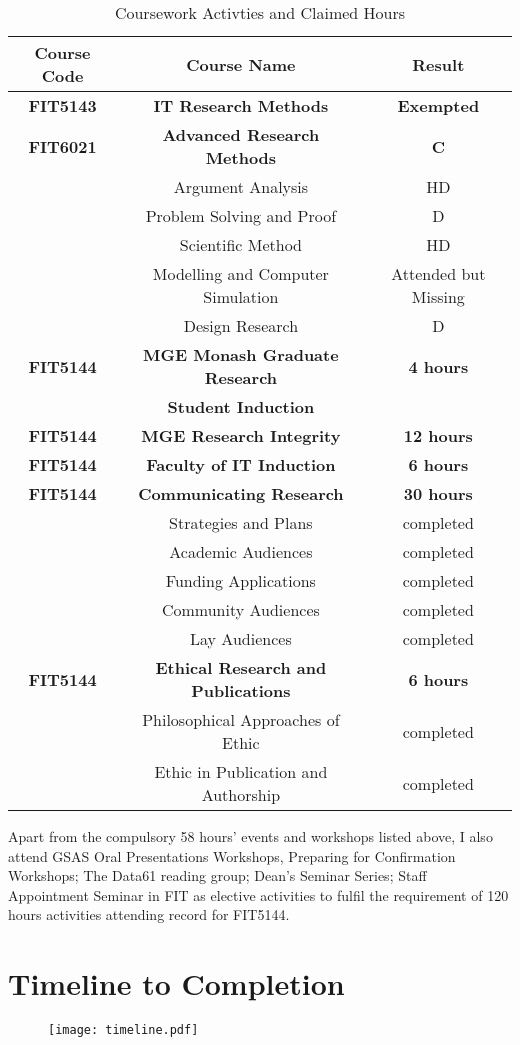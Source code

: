 \begin{table}[h]
\centering
\begin{tabular}{|c|c|c|}
\hline
\bf Course Code & \bf Course Name & \bf Result \\ \hline
\bf FIT5143 & \bf IT Research Methods & \bf Exempted \\ \hline
\bf  FIT6021 & \bf Advanced Research Methods & \bf C \\ \hline
& Argument Analysis & HD \\ \hline
& Problem Solving and Proof & D \\ \hline
& Scientific Method & HD \\ \hline
& Modelling and Computer Simulation & Attended but Missing \\ \hline
& Design Research & D \\ \hline
\bf FIT5144 & \bf MGE Monash Graduate Research & \bf 4 hours \\ 
& \bf Student Induction &  \\ \hline
\bf FIT5144 & \bf MGE  Research Integrity & \bf 12 hours \\ \hline
\bf FIT5144 & \bf Faculty of IT Induction & \bf 6 hours \\ \hline
\bf FIT5144 & \bf Communicating Research & \bf 30 hours\\ \hline
& Strategies and Plans & completed \\ \hline
& Academic Audiences & completed \\ \hline
& Funding Applications & completed \\ \hline
& Community Audiences & completed \\ \hline
& Lay Audiences & completed \\ \hline
\bf FIT5144 & \bf Ethical Research and Publications & \bf 6 hours\\ \hline
& Philosophical Approaches of Ethic & completed \\ \hline
& Ethic in Publication and Authorship & completed \\ \hline
\end{tabular}
\caption{Coursework Activties and Claimed Hours}
\label{tlb:coursework}
\end{table}

Apart from the compulsory 58 hours' events and workshops listed above, I also attend GSAS Oral Presentations Workshops, Preparing for Confirmation Workshops; The Data61 reading group; Dean's Seminar Series; Staff Appointment Seminar in FIT as elective activities to fulfil the requirement of 120 hours activities attending record for FIT5144.


\chapter{Timeline to Completion}
\begin{figure}[h]
\texttt{[image: timeline.pdf]}
\end{figure}
